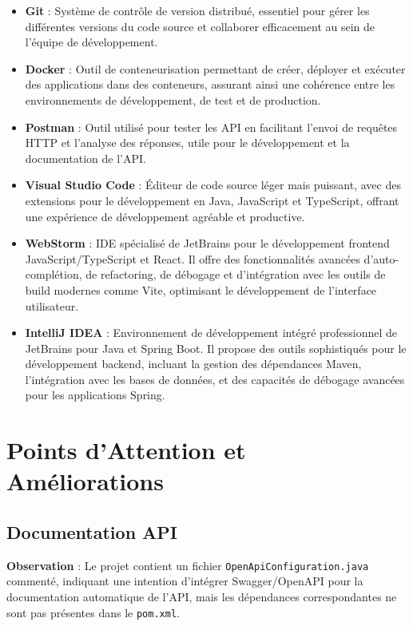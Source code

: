 \begin{itemize}
    \item \textbf{Git} : Système de contrôle de version distribué, essentiel pour gérer les différentes versions du code source et collaborer efficacement au sein de l'équipe de développement.

    \item \textbf{Docker} : Outil de conteneurisation permettant de créer, déployer et exécuter des applications dans des conteneurs, assurant ainsi une cohérence entre les environnements de développement, de test et de production.

    \item \textbf{Postman} : Outil utilisé pour tester les API en facilitant l'envoi de requêtes HTTP et l'analyse des réponses, utile pour le développement et la documentation de l'API.

    \item \textbf{Visual Studio Code} : Éditeur de code source léger mais puissant, avec des extensions pour le développement en Java, JavaScript et TypeScript, offrant une expérience de développement agréable et productive.

    \item \textbf{WebStorm} : IDE spécialisé de JetBrains pour le développement frontend JavaScript/TypeScript et React. Il offre des fonctionnalités avancées d'auto-complétion, de refactoring, de débogage et d'intégration avec les outils de build modernes comme Vite, optimisant le développement de l'interface utilisateur.

    \item \textbf{IntelliJ IDEA} : Environnement de développement intégré professionnel de JetBrains pour Java et Spring Boot. Il propose des outils sophistiqués pour le développement backend, incluant la gestion des dépendances Maven, l'intégration avec les bases de données, et des capacités de débogage avancées pour les applications Spring.
\end{itemize}

\section{Points d'Attention et Améliorations}

\subsection{Documentation API}

\textbf{Observation} : Le projet contient un fichier \texttt{OpenApiConfiguration.java} commenté, indiquant une intention d'intégrer Swagger/OpenAPI pour la documentation automatique de l'API, mais les dépendances correspondantes ne sont pas présentes dans le \texttt{pom.xml}.

